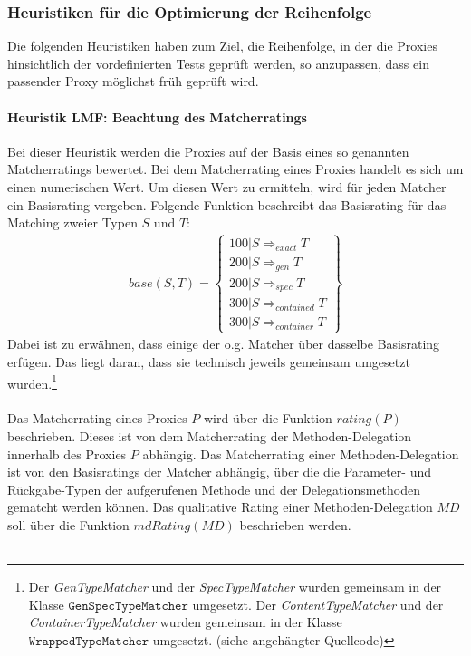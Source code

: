 \documentclass[a4paper,12pt]{article}
\begin{document}
\subsubsection{Heuristiken für die Optimierung der Reihenfolge}
Die folgenden Heuristiken haben zum Ziel, die Reihenfolge, in der die Proxies hinsichtlich der vordefinierten Tests geprüft werden, so anzupassen, dass ein passender Proxy möglichst früh geprüft wird.


\paragraph{Heuristik LMF: Beachtung des Matcherratings}
\noindent
\newline
Bei dieser Heuristik werden die Proxies auf der Basis eines so genannten Matcherratings bewertet. Bei dem Matcherrating eines Proxies handelt es sich um einen numerischen Wert. Um diesen Wert zu ermitteln, wird für jeden Matcher ein Basisrating vergeben. Folgende Funktion beschreibt das Basisrating für das Matching zweier Typen $S$ und $T$:
\begin{gather*}
\mathit{base(S,T)} =  \left\{ 
				\begin{array}{l}
					100 | S \Rightarrow_{exact}  T  \\
					200 | S \Rightarrow_{gen}  T  \\
					200 | S \Rightarrow_{spec}  T  \\
					300 | S \Rightarrow_{contained}  T   \\
					300 | S \Rightarrow_{container}  T  					
				\end{array}
              \right\}
\end{gather*}
\noindent
Dabei ist zu erwähnen, dass einige der o.g. Matcher über dasselbe Basisrating erfügen. Das liegt daran, dass sie technisch jeweils gemeinsam umgesetzt wurden.\footnote{Der \emph{GenTypeMatcher} und der \emph{SpecTypeMatcher} wurden gemeinsam in der Klasse $\texttt{GenSpecTypeMatcher}$ umgesetzt. Der \emph{ContentTypeMatcher} und der \emph{ContainerTypeMatcher} wurden gemeinsam in der Klasse $\texttt{WrappedTypeMatcher}$ umgesetzt. (siehe angehängter Quellcode)}\\\\
Das Matcherrating eines Proxies $P$ wird über die Funktion $\mathit{rating(P)}$ beschrieben. Dieses ist von dem Matcherrating der Methoden-Delegation innerhalb des Proxies $P$ abhängig. Das Matcherrating einer Methoden-Delegation ist von den Basisratings der Matcher abhängig, über die die Parameter- und Rückgabe-Typen der aufgerufenen Methode und der Delegationsmethoden gematcht werden können. Das qualitative Rating einer Methoden-Delegation $\mathit{MD}$ soll über die Funktion $\mathit{mdRating(MD)}$ beschrieben werden.\\\\
\end{document}
